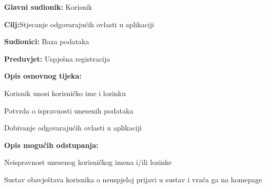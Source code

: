 					\noindent {}
					\begin{packed_item}
	
						\item \textbf{Glavni sudionik: }Korisnik
						\item  \textbf{Cilj:}Stjecanje odgovarajućih ovlasti u aplikaciji
						\item  \textbf{Sudionici:} Baza podataka
						\item  \textbf{Preduvjet:} Uspješna registracija
						\item  \textbf{Opis osnovnog tijeka:}
						
						\item[] \begin{packed_enum}
	
							\item Korisnik unosi korisničko ime i lozinku
							\item Potvrda o ispravnosti unesenih podataka
							\item Dobivanje odgovarajućih ovlasti u aplikaciji
						\end{packed_enum}
						
						\item  \textbf{Opis mogućih odstupanja:}
						
						\item[] \begin{packed_item}
	
							\item[2.a] Neispravnost unesenog korisničkog imena i/ili lozinke
							\item[] \begin{packed_enum}
								
								\item Sustav obavještava korisnika o neuspjeloj prijavi u sustav i vraća ga na homepage
								
								
							\end{packed_enum}
							
						\end{packed_item}
					\end{packed_item}
					
